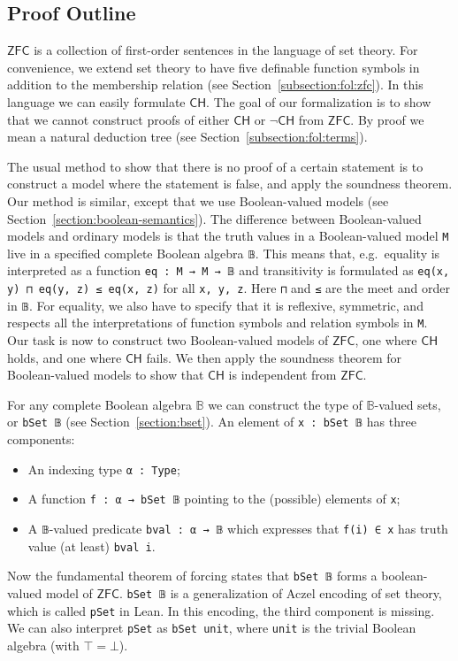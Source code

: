 \documentclass[sigplan,10pt,review, anonymous]{acmart}
\newcommand{\lil}{\lstinline}
\newcommand{\ZFC}{\mathsf{ZFC}}
\newcommand{\CH}{\mathsf{CH}}
\theoremstyle{definition}
\begin{document}
\subsection{Proof Outline}
\label{subsection:intro:outline}
$\ZFC$ is a collection of first-order sentences in the language of set theory. For convenience, we extend set theory to have five definable function symbols in addition to the membership relation (see Section~\ref{subsection:fol:zfc}).
In this language we can easily formulate $\CH$.
The goal of our formalization is to show that we cannot construct proofs of either $\CH$ or $\neg\CH$ from $\ZFC$.
By proof we mean a natural deduction tree (see Section~\ref{subsection:fol:terms}).

The usual method to show that there is no proof of a certain statement is to construct a model where the statement is false, and apply the soundness theorem.
Our method is similar, except that we use Boolean-valued models (see Section~\ref{section:boolean-semantics}).
The difference between Boolean-valued models and ordinary models is that the truth values in a Boolean-valued model \lil{M} live in a specified complete Boolean algebra \lil{𝔹}.
This means that, e.g.\ equality is interpreted as a function \lil{eq : M → M → 𝔹} and transitivity is formulated as \lil{eq(x, y) ⊓ eq(y, z) ≤ eq(x, z)} for all \lil{x, y, z}.
Here \lil{⊓} and \lil{≤} are the meet and order in \lil{𝔹}.
For equality, we also have to specify that it is reflexive, symmetric, and respects all the interpretations of function symbols and relation symbols in \lil{M}.
Our task is now to construct two Boolean-valued models of $\ZFC$, one where $\CH$ holds, and one where $\CH$ fails.
We then apply the soundness theorem for Boolean-valued models to show that $\CH$ is independent from $\ZFC$.

For any complete Boolean algebra $\mathbb{B}$ we can construct the type of $\mathbb{B}$-valued sets, or \lil{bSet 𝔹} (see Section~\ref{section:bset}).
An element of \lil{x : bSet 𝔹} has three components:
\begin{itemize}
\item An indexing type \lil{α : Type};
\item A function \lil{f : α → bSet 𝔹} pointing to the (possible) elements of \lil{x};
\item A \lil{𝔹}-valued predicate \lil{bval : α → 𝔹} which expresses that \lil{f(i) ∈ x} has truth value (at least) \lil{bval i}.
\end{itemize}
Now the fundamental theorem of forcing states that \lil{bSet 𝔹} forms a boolean-valued model of $\ZFC$.
\lil{bSet 𝔹} is a generalization of Aczel encoding of set theory, which is called \lil{pSet} in Lean.
In this encoding, the third component is missing.
We can also interpret \lil{pSet} as \lil{bSet unit}, where \lil{unit} is the trivial Boolean algebra (with $\top=\bot$).
\end{document}
